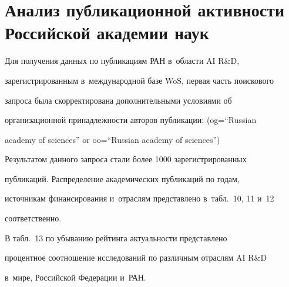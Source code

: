 \section{Анализ публикационной активности Российской академии наук}


 


 Для получения данных по публикациям РАН в~области AI R\&D, 


зарегистрированным в~международной базе WoS, первая часть поискового 


запроса была скорректирована дополнительными условиями об 


организационной принадлежности авторов публикации: (og\;=\;``Russian 


academy of sciences'' or oo\;=\;``Russian academy of sciences'')


 Результатом данного запроса стали более 1000 зарегистрированных 


публикаций. Распределение академических публикаций по годам, 


источникам финансирования и~отраслям представлено в~табл.~10, 11 и~12 


соответственно.





 


 В табл.~13 по убыванию рейтинга актуальности представлено 


процентное соотношение исследований по различным отраслям AI R\&D 


в~мире, Российской Федерации и~РАН.





